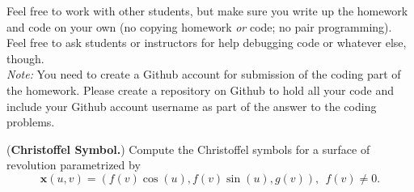\documentclass[12pt,letterpaper]{hmcpset}
\begin{document}
Feel free to work with other students, but make sure you write up the homework
and code on your own (no copying homework \textit{or} code; no pair programming).
Feel free to ask students or instructors for help debugging code or whatever else,
though.\\

\textit{Note:} You need to create a Github account for submission of the coding part of the homework. Please create a repository on Github to hold all your code and include your Github account username as part of the answer to the coding problems.

\begin{problem}[1]
(\textbf{Christoffel Symbol.}) Compute the Christoffel symbols for a surface of revolution parametrized by 
$$\textbf{x}(u,v)=(f(v)\cos(u), f(v)\sin(u), g(v)), ~~f(v)\neq0.$$ 
\end{problem}
\begin{solution}
    \vfill
\end{solution}
\newpage
\end{document}
